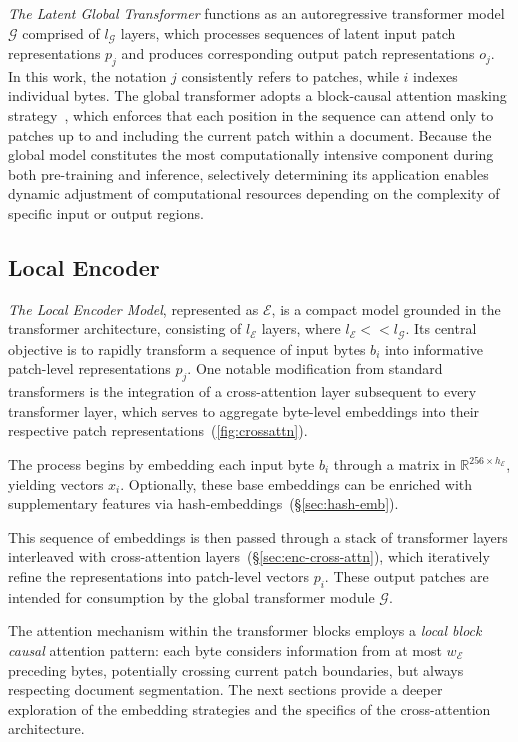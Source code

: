 \textit{The Latent Global Transformer} functions as an autoregressive transformer model $\mathcal{G}$ comprised of $l_{\mathcal{G}}$ layers, which processes sequences of latent input patch representations $p_j$ and produces corresponding output patch representations $o_j$. In this work, the notation $j$ consistently refers to patches, while $i$ indexes individual bytes. The global transformer adopts a block-causal attention masking strategy~\citep{dubey2024llama}, which enforces that each position in the sequence can attend only to patches up to and including the current patch within a document. Because the global model constitutes the most computationally intensive component during both pre-training and inference, selectively determining its application enables dynamic adjustment of computational resources depending on the complexity of specific input or output regions.

\subsection{Local Encoder}
\label{section:local}

\textit{The Local Encoder Model}, represented as $\mathcal{E}$, is a compact model grounded in the transformer architecture, consisting of $l_{\mathcal{E}}$ layers, where $l_{\mathcal{E}} << l_{\mathcal{G}}$. Its central objective is to rapidly transform a sequence of input bytes $b_i$ into informative patch-level representations $p_j$. One notable modification from standard transformers is the integration of a cross-attention layer subsequent to every transformer layer, which serves to aggregate byte-level embeddings into their respective patch representations~(\autoref{fig:crossattn}). 

The process begins by embedding each input byte $b_i$ through a matrix in $\mathbb{R}^{256 \times h_{\mathcal{E}}}$, yielding vectors $x_i$. Optionally, these base embeddings can be enriched with supplementary features via hash-embeddings~(\S\ref{sec:hash-emb}).

This sequence of embeddings is then passed through a stack of transformer layers interleaved with cross-attention layers~(\S\ref{sec:enc-cross-attn}), which iteratively refine the representations into patch-level vectors $p_i$. These output patches are intended for consumption by the global transformer module $\mathcal{G}$.

The attention mechanism within the transformer blocks employs a \textit{local block causal} attention pattern: each byte considers information from at most $w_{\mathcal{E}}$ preceding bytes, potentially crossing current patch boundaries, but always respecting document segmentation. The next sections provide a deeper exploration of the embedding strategies and the specifics of the cross-attention architecture.

